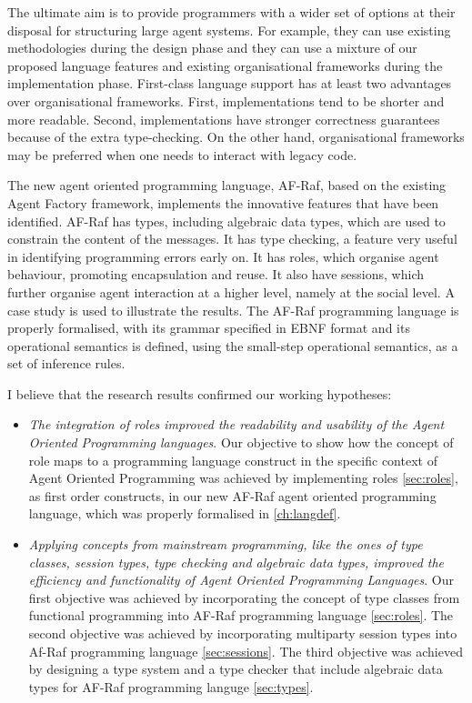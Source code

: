 \documentclass[a4paper,12pt,oneside,fleqn]{book} %
\begin{document}
The ultimate aim is to provide programmers with a wider set of options at
their disposal for structuring large agent systems. For example, they can
use existing methodologies during the design phase and they can use a
mixture of our proposed language features and existing organisational
frameworks during the implementation phase. First-class language support
has at least two advantages over organisational frameworks. First,
implementations tend to be shorter and more readable. Second,
implementations have stronger correctness guarantees because of the extra
type-checking. On the other hand, organisational frameworks may be
preferred when one needs to interact with legacy code.

The new agent oriented programming language, AF-Raf, based on the existing
Agent Factory framework, implements the innovative features that have been
identified. AF-Raf has types, including algebraic data types, which are
used to constrain the content of the messages. It has type checking, a
feature very useful in identifying programming errors early on. It has
roles, which organise agent behaviour, promoting encapsulation and reuse.
It also have sessions, which further organise agent interaction at a higher
level, namely at the social level. A case study is used to illustrate the
results. The AF-Raf programming language is properly formalised, with its
grammar specified in EBNF format and its operational semantics is defined,
using the small-step operational semantics, as a set of inference rules.

I believe that the research results confirmed our working hypotheses:

\begin{itemize}
\item \textit{The integration of roles improved the readability and
usability of the Agent Oriented Programming languages}. Our objective to
show how the concept of role maps to a programming language construct in
the specific context of Agent Oriented Programming was achieved by
implementing roles \autoref{sec:roles}, as first order constructs, in our new AF-Raf
agent oriented programming language, which was properly formalised in
\autoref{ch:langdef}.

\item \textit{Applying concepts from mainstream programming, like the ones
of type classes, session types, type checking and algebraic data types,
improved the efficiency and functionality of Agent Oriented Programming
Languages}. Our first objective was achieved by incorporating the concept
of type classes from functional programming into AF-Raf programming
language \autoref{sec:roles}. The second objective was achieved by
incorporating multiparty session types into Af-Raf programming language
\autoref{sec:sessions}. The third objective was achieved by designing a
type system and a type checker that include algebraic data types for AF-Raf
programming languge \autoref{sec:types}.

\end{itemize}


\appendix
\end{document}
